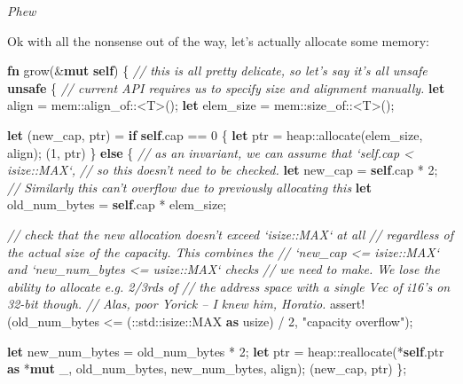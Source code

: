 \documentclass[a4paper,]{book}
\newenvironment{Shaded}{\begin{snugshade}}{\end{snugshade}}
\newcommand{\KeywordTok}[1]{\textcolor[rgb]{0.13,0.29,0.53}{\textbf{{#1}}}}
\newcommand{\DecValTok}[1]{\textcolor[rgb]{0.00,0.00,0.81}{{#1}}}
\newcommand{\StringTok}[1]{\textcolor[rgb]{0.31,0.60,0.02}{{#1}}}
\newcommand{\CommentTok}[1]{\textcolor[rgb]{0.56,0.35,0.01}{\textit{{#1}}}}
\newcommand{\OtherTok}[1]{\textcolor[rgb]{0.56,0.35,0.01}{{#1}}}
\newcommand{\NormalTok}[1]{{#1}}
\begin{document}
\emph{Phew}

Ok with all the nonsense out of the way, let's actually allocate some
memory:

\begin{Shaded}
\begin{Highlighting}[]
\KeywordTok{fn} \NormalTok{grow(&}\KeywordTok{mut} \KeywordTok{self}\NormalTok{) \{}
    \CommentTok{// this is all pretty delicate, so let's say it's all unsafe}
    \KeywordTok{unsafe} \NormalTok{\{}
        \CommentTok{// current API requires us to specify size and alignment manually.}
        \KeywordTok{let} \NormalTok{align = mem::align_of::<T>();}
        \KeywordTok{let} \NormalTok{elem_size = mem::size_of::<T>();}

        \KeywordTok{let} \NormalTok{(new_cap, ptr) = }\KeywordTok{if} \KeywordTok{self}\NormalTok{.cap == }\DecValTok{0} \NormalTok{\{}
            \KeywordTok{let} \NormalTok{ptr = heap::allocate(elem_size, align);}
            \NormalTok{(}\DecValTok{1}\NormalTok{, ptr)}
        \NormalTok{\} }\KeywordTok{else} \NormalTok{\{}
            \CommentTok{// as an invariant, we can assume that `self.cap < isize::MAX`,}
            \CommentTok{// so this doesn't need to be checked.}
            \KeywordTok{let} \NormalTok{new_cap = }\KeywordTok{self}\NormalTok{.cap * }\DecValTok{2}\NormalTok{;}
            \CommentTok{// Similarly this can't overflow due to previously allocating this}
            \KeywordTok{let} \NormalTok{old_num_bytes = }\KeywordTok{self}\NormalTok{.cap * elem_size;}

            \CommentTok{// check that the new allocation doesn't exceed `isize::MAX` at all}
            \CommentTok{// regardless of the actual size of the capacity. This combines the}
            \CommentTok{// `new_cap <= isize::MAX` and `new_num_bytes <= usize::MAX` checks}
            \CommentTok{// we need to make. We lose the ability to allocate e.g. 2/3rds of}
            \CommentTok{// the address space with a single Vec of i16's on 32-bit though.}
            \CommentTok{// Alas, poor Yorick -- I knew him, Horatio.}
            \OtherTok{assert!}\NormalTok{(old_num_bytes <= (::std::isize::MAX }\KeywordTok{as} \NormalTok{usize) / }\DecValTok{2}\NormalTok{,}
                    \StringTok{"capacity overflow"}\NormalTok{);}

            \KeywordTok{let} \NormalTok{new_num_bytes = old_num_bytes * }\DecValTok{2}\NormalTok{;}
            \KeywordTok{let} \NormalTok{ptr = heap::reallocate(*}\KeywordTok{self}\NormalTok{.ptr }\KeywordTok{as} \NormalTok{*}\KeywordTok{mut} \NormalTok{_,}
                                        \NormalTok{old_num_bytes,}
                                        \NormalTok{new_num_bytes,}
                                        \NormalTok{align);}
            \NormalTok{(new_cap, ptr)}
        \NormalTok{\};}


\end{Highlighting}
\end{Shaded}
\end{document}
